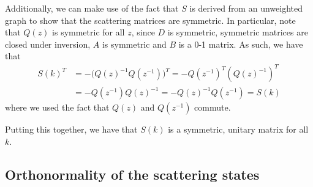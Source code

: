 \documentclass[../thesis-main/thesis-main]{subfiles}
\begin{document}
Additionally, we can make use of the fact that $S$ is derived from an unweighted graph to show that the scattering matrices are symmetric.  In particular, note that $Q(z)$ is symmetric for all $z$, since $D$ is symmetric, symmetric matrices are closed under inversion, $A$ is symmetric and $B$ is a 0-1 matrix.  As such, we have that
\begin{align}
  S(k)^T &= -\big( Q(z)^{-1} Q(z^{-1})\big)^T = -Q(z^{-1})^T (Q(z)^{-1})^T \\
    &= -Q(z^{-1}) Q(z)^{-1} = -Q(z)^{-1} Q(z^{-1}) = S(k)
\end{align}
where we used the fact that $Q(z)$ and $Q(z^{-1})$ commute.

Putting this together, we have that $S(k)$ is a symmetric, unitary matrix for all $k$.

\subsection{Orthonormality of the scattering states}

\end{document}
